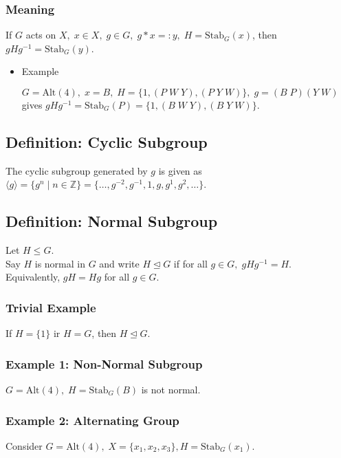 \documentclass[11pt]{article}
\newcommand{\0}{\emptyset}
\newcommand{\Z}{\mathbb{Z}}
\begin{document}
\subsubsection*{Meaning}
\label{sec:org1669a77}
If \(G\) acts on \(X,\;x\in X,\;g\in G,\;g*x=:y,\;H=\text{Stab}_{G}(x)\), then \(gHg^{-1}=\text{Stab}_{G}(y)\).\\[0pt]
\begin{itemize}
\item Example
\label{sec:org04c6f80}

\(G=\text{Alt}(4),\;x=B,\;H=\{1,(P\;W\;Y),(P\;Y\;W)\},\;g=(B\;P)(Y\;W)\)\\[0pt]
gives \(gHg^{-1}=\text{Stab}_{G}(P)=\{1,(B\;W\;Y),(B\;Y\;W)\}\).\\[0pt]
\end{itemize}
\subsection*{Definition: Cyclic Subgroup}
\label{sec:org6caa5e9}
The cyclic subgroup generated by \(g\) is given as  \(\langle g\rangle=\{g^{n}\;|\;n\in\Z\}=\{\ldots,g^{-2},g^{-1},1,g,g^{1},g^{2},\ldots\}\).\\[0pt]
\subsection*{Definition: Normal Subgroup}
\label{sec:orgec6b460}
Let \(H\leq G\).\\[0pt]
Say \(H\) is normal in \(G\) and write \(H\trianglelefteq G\) if for all \(g\in G,\;gHg^{-1}=H\).\\[0pt]
Equivalently, \(gH=Hg\) for all \(g\in G\).\\[0pt]
\subsubsection*{Trivial Example}
\label{sec:orgb5abd57}
If \(H=\{1\}\) ir \(H=G\), then \(H\trianglelefteq G\).\\[0pt]
\subsubsection*{Example 1: Non-Normal Subgroup}
\label{sec:orgc963c14}
\(G=\text{Alt}(4),\;H=\text{Stab}_{G}(B)\) is not normal.\\[0pt]
\subsubsection*{Example 2: Alternating Group}
\label{sec:org4572c74}
Consider \(G=\text{Alt}(4),\;X=\{x_{1},x_{2},x_{3}\}, H=\text{Stab}_{G}(x_{1})\).\\[0pt]
\end{document}
